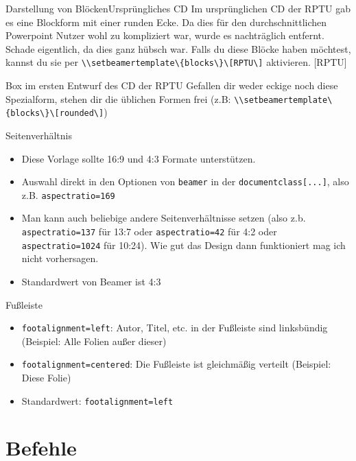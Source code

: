 \documentclass[german,10pt,xcolor=colortbl,compress
]{beamer}
\begin{document}
\begin{frame}{Darstellung von Blöcken}{Ursprüngliches CD}
	Im ursprünglichen CD der RPTU gab es eine Blockform mit einer runden Ecke. Da dies für den durchschnittlichen Powerpoint Nutzer wohl zu kompliziert war, wurde es nachträglich entfernt. Schade eigentlich, da dies ganz hübsch war. Falls du diese Blöcke haben möchtest, kannst du sie per \lstinline!\\setbeamertemplate\{blocks\}\[RPTU\]! aktivieren.
	[RPTU]
	\begin{block}{Box im ersten Entwurf des CD der RPTU}
		Gefallen dir weder eckige noch diese Spezialform, stehen dir die üblichen Formen frei (z.B: \lstinline!\\setbeamertemplate\{blocks\}\[rounded\]!)
	\end{block}
\end{frame}
\begin{frame}{Seitenverhältnis}
	\begin{itemize}
		\item Diese Vorlage sollte 16:9 und 4:3 Formate unterstützen.
		\item Auswahl direkt in den Optionen von \lstinline!beamer! in der \lstinline!documentclass[...]!, also z.B. \lstinline!aspectratio=169!
		\item Man kann auch beliebige andere Seitenverhältnisse setzen (also z.b. \lstinline!aspectratio=137! für 13:7 oder \lstinline!aspectratio=42! für 4:2 oder \lstinline!aspectratio=1024! für 10:24). Wie gut das Design dann funktioniert mag ich nicht vorhersagen.
		\item Standardwert von Beamer ist 4:3
	\end{itemize}
\end{frame}
\def\rptufootalignment{centered}%
\begin{frame}{Fußleiste}
	\begin{itemize}
		\item \lstinline|footalignment=left|: Autor, Titel, etc. in der Fußleiste sind linksbündig (Beispiel: Alle Folien außer dieser)
		\item \lstinline|footalignment=centered|: Die Fußleiste ist gleichmäßig verteilt (Beispiel: Diese Folie)
		\item Standardwert: \lstinline|footalignment=left|
	\end{itemize}
\end{frame}
\def\rptufootalignment{left}%
\section{Befehle}
\end{document}
